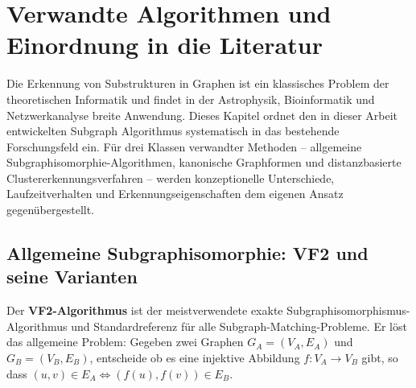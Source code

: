 ﻿\documentclass[a4paper,12pt]{report}
\theoremstyle{definition}
\begin{document}
\chapter{Verwandte Algorithmen und Einordnung in die Literatur}
\label{chap:related}

Die Erkennung von Substrukturen in Graphen ist ein klassisches Problem der theoretischen Informatik und findet in der Astrophysik, Bioinformatik und Netzwerkanalyse breite Anwendung. Dieses Kapitel ordnet den in dieser Arbeit entwickelten Subgraph Algorithmus systematisch in das bestehende Forschungsfeld ein. Für drei Klassen verwandter Methoden -- allgemeine Subgraphisomorphie-Algorithmen, kanonische Graphformen und distanzbasierte Clustererkennungsverfahren -- werden konzeptionelle Unterschiede, Laufzeitverhalten und Erkennungseigenschaften dem eigenen Ansatz gegenübergestellt.

\section{Allgemeine Subgraphisomorphie: VF2 und seine Varianten}
\label{sec:related_vf2}

Der \textbf{VF2-Algorithmus} \cite{cordella2004} ist der meistverwendete exakte Subgraphisomorphismus-Algorithmus und Standardreferenz für alle Subgraph-Matching-Probleme. Er löst das allgemeine Problem: Gegeben zwei Graphen $G_A = (V_A, E_A)$ und $G_B = (V_B, E_B)$, entscheide ob es eine injektive Abbildung $f: V_A \to V_B$ gibt, so dass $(u,v) \in E_A \Leftrightarrow (f(u), f(v)) \in E_B$.
\end{document}
